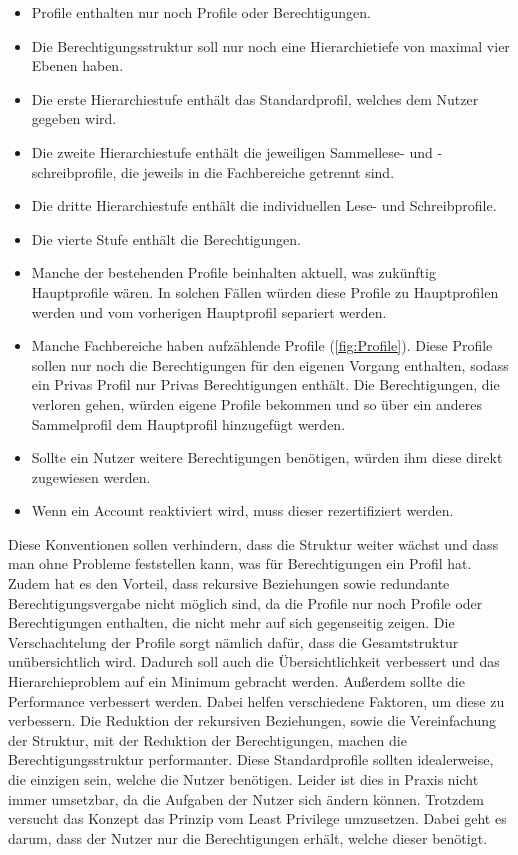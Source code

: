 \begin{itemize}
	\item Profile enthalten nur noch Profile oder Berechtigungen.
	\item Die Berechtigungsstruktur soll nur noch eine Hierarchietiefe von maximal vier Ebenen haben.
	\item Die erste Hierarchiestufe enthält das Standardprofil, welches dem Nutzer gegeben wird.
	\item Die zweite Hierarchiestufe enthält die jeweiligen Sammellese- und -schreibprofile, die jeweils in die Fachbereiche getrennt sind.
	\item Die dritte Hierarchiestufe enthält die individuellen Lese- und Schreibprofile.
	\item Die vierte Stufe enthält die Berechtigungen.
	\item Manche der bestehenden Profile beinhalten aktuell, was zukünftig Hauptprofile wären.
In solchen Fällen würden diese Profile zu Hauptprofilen werden und vom vorherigen Hauptprofil separiert werden.
	\item Manche Fachbereiche haben aufzählende Profile (\ref{fig:Profile}).
Diese Profile sollen nur noch die Berechtigungen für den eigenen Vorgang enthalten, sodass ein Privas Profil nur Privas Berechtigungen enthält.
Die Berechtigungen, die verloren gehen, würden eigene Profile bekommen und so über ein anderes Sammelprofil dem Hauptprofil hinzugefügt werden.
	\item Sollte ein Nutzer weitere Berechtigungen benötigen, würden ihm diese direkt zugewiesen werden.
	\item Wenn ein Account reaktiviert wird, muss dieser rezertifiziert werden.
\end{itemize}
Diese Konventionen sollen verhindern, dass die Struktur weiter wächst und dass man ohne Probleme feststellen kann, was für Berechtigungen ein Profil hat.
Zudem hat es den Vorteil, dass rekursive Beziehungen sowie redundante Berechtigungsvergabe nicht möglich sind, da die Profile nur noch Profile oder Berechtigungen enthalten, die nicht mehr auf sich gegenseitig zeigen.
Die Verschachtelung der Profile sorgt nämlich dafür, dass die Gesamtstruktur unübersichtlich wird. \cite[21]{RuB}
Dadurch soll auch die Übersichtlichkeit verbessert und das Hierarchieproblem auf ein Minimum gebracht werden.
Außerdem sollte die Performance verbessert werden.
Dabei helfen verschiedene Faktoren, um diese zu verbessern.
Die Reduktion der rekursiven Beziehungen, sowie die Vereinfachung der Struktur, mit der Reduktion der Berechtigungen, machen die Berechtigungsstruktur performanter.
Diese Standardprofile sollten idealerweise, die einzigen sein, welche die Nutzer benötigen. \cite[21]{RuB}
Leider ist dies in Praxis nicht immer umsetzbar, da die Aufgaben der Nutzer sich ändern können.
Trotzdem versucht das Konzept das Prinzip vom Least Privilege umzusetzen.
Dabei geht es darum, dass der Nutzer nur die Berechtigungen erhält, welche dieser benötigt. \cite[1]{LePr}


